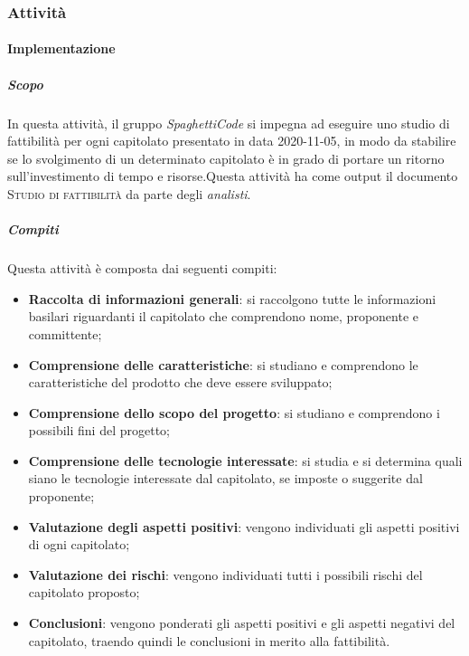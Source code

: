 \subsubsection{Attività}

\paragraph{Implementazione}
\label{par:Implementazione}
\subparagraph{Scopo}
\label{par:Implementazione:scopo}
In questa attività, il gruppo \emph{SpaghettiCode} si impegna ad eseguire uno studio di fattibilità per ogni capitolato presentato in data 2020-11-05, in modo da stabilire se lo svolgimento di un determinato capitolato è in grado di portare un ritorno sull'investimento di tempo e risorse.Questa attività ha come output il documento \textsc{Studio di fattibilità} da parte degli \emph{analisti}.\\
\subparagraph{Compiti}
\label{par:Implementazione:compiti}
Questa attività è composta dai seguenti compiti:
\begin{itemize}
    \item \textbf{Raccolta di informazioni generali}: si raccolgono tutte le informazioni basilari riguardanti il
    capitolato che comprendono nome, proponente e committente;
    \item \textbf{Comprensione delle caratteristiche}: si studiano e comprendono le caratteristiche del prodotto che
    deve essere sviluppato;
    \item \textbf{Comprensione dello scopo del progetto}: si studiano e comprendono i possibili fini del progetto;
    \item \textbf{Comprensione delle tecnologie interessate}: si studia e si determina quali siano le tecnologie
    interessate dal capitolato, se imposte o suggerite dal proponente;
    \item \textbf{Valutazione degli aspetti positivi}: vengono individuati gli aspetti positivi di ogni capitolato;
    \item \textbf{Valutazione dei rischi}: vengono individuati tutti i possibili rischi del capitolato proposto;
    \item \textbf{Conclusioni}: vengono ponderati gli aspetti positivi e gli aspetti negativi del capitolato, traendo
        quindi le conclusioni in merito alla fattibilità.
\end{itemize}


